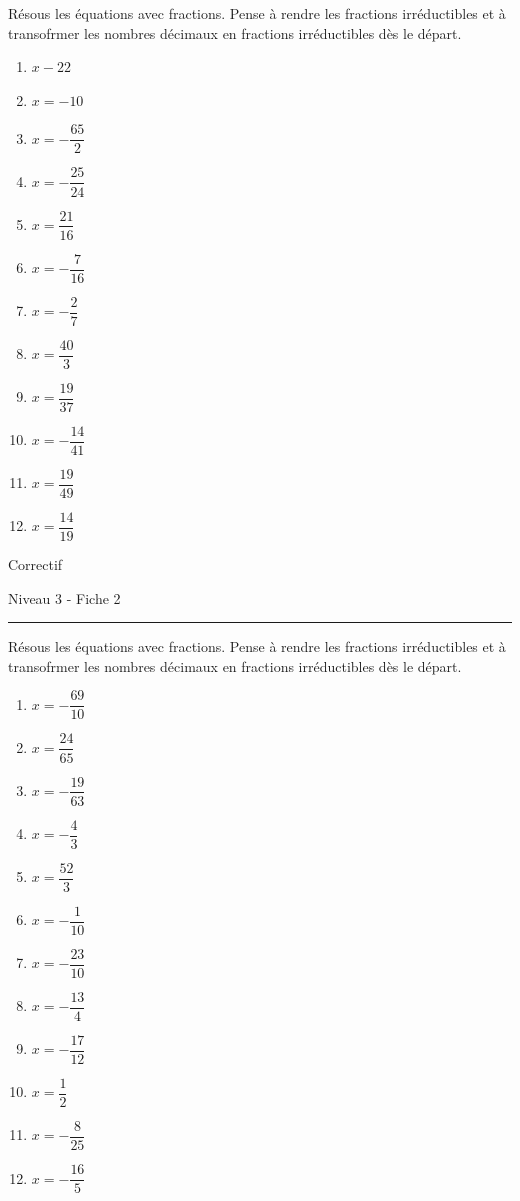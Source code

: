 \documentclass[12pt,parskip=half-, twoside=semi]{scrartcl}
\begin{document}
\begin{exercise}
  Résous les équations avec fractions. Pense à rendre les fractions irréductibles et à transofrmer les nombres décimaux en fractions irréductibles dès le départ.
  \begin{enumerate}[itemsep=0.4cm]   
      \item $x-22$
      \item $x=-10$
      \item $x=-\dfrac{65}{2}$
      \item $x=-\dfrac{25}{24}$
      \item $x=\dfrac{21}{16}$
      \item $x=-\dfrac{7}{16}$
      \item $x=-\dfrac{2}{7}$
      \item $x=\dfrac{40}{3}$
      \item $x=\dfrac{19}{37}$
      \item $x=-\dfrac{14}{41}$
      \item $x=\dfrac{19}{49}$
      \item $x=\dfrac{14}{19}$
  \end{enumerate}
\end{exercise}


\newpage


\begin{center}
  \bfseries
  \begin{Huge}
    Correctif
  \end{Huge}
  \smallbreak
  \begin{large}
    Niveau 3  - Fiche 2
  \end{large}
  \smallbreak
  \rule[10pt]{.5\linewidth}{1 pt}
\end{center}
\setcounter{exercise}{0}

\begin{exercise}
  Résous les équations avec fractions. Pense à rendre les fractions irréductibles et à transofrmer les nombres décimaux en fractions irréductibles dès le départ.
  \begin{enumerate} [itemsep=0.4cm]   
      \item $x=-\dfrac{69}{10}$
      \item $x=\dfrac{24}{65}$
      \item $x=-\dfrac{19}{63}$
      \item $x=-\dfrac{4}{3}$
      \item $x=\dfrac{52}{3}$
      \item $x=-\dfrac{1}{10}$
      \item $x=-\dfrac{23}{10}$
      \item $x=-\dfrac{13}{4}$
      \item $x=-\dfrac{17}{12}$
      \item $x=\dfrac{1}{2}$
      \item $x=-\dfrac{8}{25}$
      \item $x=-\dfrac{16}{5}$
  \end{enumerate}
\end{exercise}
\end{document}
